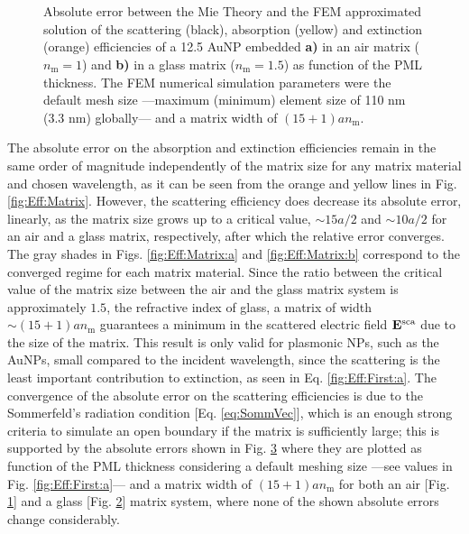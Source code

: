 %
\begin{figure}[b!]
	\centering
	\def\svgwidth{.9\textwidth}
	\small
	\vspace*{.5em}
	\hspace*{-.675\textwidth}
	 \begin{subfigure}{\textwidth}\caption{}\label{fig:Eff:PML:a}\end{subfigure}\\[6.5em]
		 \hspace*{-.675\textwidth}
	      \begin{subfigure}{\textwidth}\caption{}\label{fig:Eff:PML:b}\end{subfigure}\\[-10.5em]
\caption[Scattering, Absorption and Extinction Efficiencies absolute error: PML thickness analysis ]{Absolute error between the Mie Theory and the FEM approximated solution of the scattering (black), absorption (yellow) and extinction (orange) efficiencies of a 12.5 AuNP embedded \textbf{a)} in an air matrix ($n_\text{m} = 1$) and \textbf{b)} in a glass matrix ($n_\text{m} = 1.5$) as function of the PML thickness. The FEM numerical simulation parameters were the default mesh size ---maximum (minimum) element size of 110 nm (3.3 nm) globally--- and a matrix width of $(15+1) a n_\text{m}$.}
\label{fig:Eff:PML}
\end{figure}

The absolute error on the absorption and extinction efficiencies remain in the same order of magnitude independently of the matrix size for any matrix material and chosen wavelength, as it can be seen from the orange and yellow lines in Fig. \ref{fig:Eff:Matrix}. However, the scattering efficiency does decrease its absolute error, linearly, as the matrix size grows  up to a critical value, $\sim 15 a/2$ and $\sim 10 a/2$ for an air and a glass matrix, respectively, after which the relative error converges. The gray shades in Figs. \ref{fig:Eff:Matrix:a}  and \ref{fig:Eff:Matrix:b} correspond to the converged regime for each matrix material. Since the ratio between the critical value of the matrix size between the air  and the glass matrix system is approximately $1.5$, the refractive index of glass, a matrix of width $\sim (15+1) a n_\text{m}$ guarantees a minimum in the scattered electric field $\vb{E}^\text{sca}$ due to the size of the matrix. This result is only valid for plasmonic NPs, such as the AuNPs, small compared to the incident wavelength, since the scattering is the least important contribution to extinction, as seen in Eq. \ref{fig:Eff:First:a}. The convergence of the absolute error on the scattering efficiencies is due to the Sommerfeld's radiation condition [Eq. \eqref{eq:SommVec}], which is an enough strong criteria to simulate an open boundary if the matrix is sufficiently large; this is supported by the absolute errors shown in Fig. \ref{fig:Eff:PML} where they are plotted as function of the PML thickness considering a default meshing size ---see values in Fig. \ref{fig:Eff:First:a}--- and a matrix width of  $(15+1) a n_\text{m}$ for both an air [Fig. \ref{fig:Eff:PML:a}] and a glass [Fig. \ref{fig:Eff:PML:b}] matrix system, where none of the shown absolute errors change considerably.

